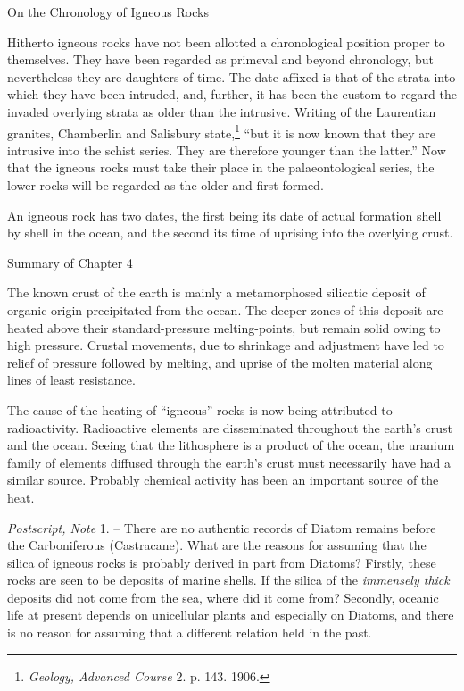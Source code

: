 \documentclass[a4paper, 12pt, oneside]{article}
\begin{document}
On the Chronology of Igneous Rocks

Hitherto igneous rocks have not been allotted a chronological position proper to themselves. They have been regarded as primeval and beyond chronology, but nevertheless they are daughters of time. The date affixed is that of the strata into which they have been intruded, and, further, it has been the custom to regard the invaded overlying strata as older than the intrusive. Writing of the Laurentian granites, Chamberlin and Salisbury state,\footnote{\emph{Geology, Advanced Course} 2. p. 143. 1906.} ``but it is now known that they are intrusive into the schist series. They are therefore younger than the latter.'' Now that the igneous rocks must take their place in the palaeontological series, the lower rocks will be regarded as the older and first formed.

An igneous rock has two dates, the first being its date of actual formation shell by shell in the ocean, and the second its time of uprising into the overlying crust.

Summary of Chapter 4 

The known crust of the earth is mainly a metamorphosed silicatic deposit of organic origin precipitated from the ocean. The deeper zones of this deposit are heated above their standard-pressure melting-points, but remain solid owing to high pressure. Crustal movements, due to shrinkage and adjustment have led to relief of pressure followed by melting, and uprise of the molten material along lines of least resistance.

The cause of the heating of ``igneous'' rocks is now being attributed to radioactivity. Radioactive elements are disseminated throughout the earth's crust and the ocean. Seeing that the lithosphere is a product of the ocean, the uranium family of elements diffused through the earth's crust must necessarily have had a similar source. Probably chemical activity has been an important source of the heat.

\emph{Postscript, Note} 1. -- There are no authentic records of Diatom remains before the Carboniferous (Castracane). What are the reasons for assuming that the silica of igneous rocks is probably derived in part from Diatoms? Firstly, these rocks are seen to be deposits of marine shells. If the silica of the \emph{immensely thick} deposits did not come from the sea, where did it come from? Secondly, oceanic life at present depends on unicellular plants and especially on Diatoms, and there is no reason for assuming that a different relation held in the past.
\end{document}
